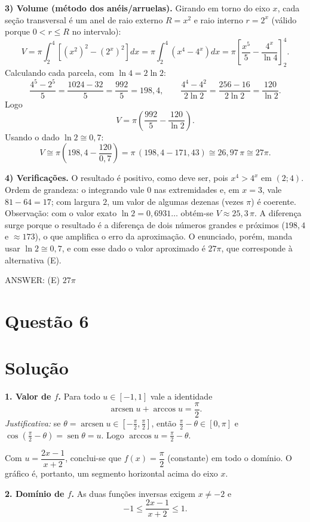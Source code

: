 \documentclass{article}%
\begin{document}
\textbf{3) Volume (método dos anéis/arruelas).} Girando em torno do eixo $x$, cada seção transversal é um anel de raio externo $R=x^2$ e raio interno $r=2^x$ (válido porque $0<r\le R$ no intervalo):
\[
V=\pi\int_{2}^{4}\left[(x^2)^2-(2^x)^2\right]dx=\pi\int_{2}^{4}\left(x^4-4^x\right)dx
=\pi\left[\frac{x^5}{5}-\frac{4^x}{\ln 4}\right]_{2}^{4}.
\]
Calculando cada parcela, com $\ln 4=2\ln 2$:
\[
\frac{4^5-2^5}{5}=\frac{1024-32}{5}=\frac{992}{5}=198{,}4,
\qquad
\frac{4^4-4^2}{2\ln 2}=\frac{256-16}{2\ln 2}=\frac{120}{\ln 2}.
\]
Logo
\[
V=\pi\left(\frac{992}{5}-\frac{120}{\ln 2}\right).
\]
Usando o dado $\ln 2\cong 0{,}7$:
\[
V\cong\pi\left(198{,}4-\frac{120}{0{,}7}\right)=\pi\,(198{,}4-171{,}43)\cong 26{,}97\,\pi\cong 27\pi .
\]

\textbf{4) Verificações.} O resultado é positivo, como deve ser, pois $x^4>4^x$ em $(2;4)$. Ordem de grandeza: o integrando vale $0$ nas extremidades e, em $x=3$, vale $81-64=17$; com largura $2$, um valor de algumas dezenas (vezes $\pi$) é coerente. Observação: com o valor exato $\ln 2=0{,}6931\ldots$ obtém-se $V\approx 25{,}3\,\pi$. A diferença surge porque o resultado é a diferença de dois números grandes e próximos ($198{,}4$ e $\approx 173$), o que amplifica o erro da aproximação. O enunciado, porém, manda usar $\ln 2\cong 0{,}7$, e com esse dado o valor aproximado é $27\pi$, que corresponde à alternativa (E).

ANSWER: (E) $27\pi$%
\newpage%
\section*{Questão 6}

\section*{Solução}

\textbf{1. Valor de $f$.} Para todo $u\in[-1,1]$ vale a identidade
\[
\operatorname{arcsen} u+\arccos u=\frac{\pi}{2}.
\]
\emph{Justificativa:} se $\theta=\operatorname{arcsen} u\in\left[-\frac{\pi}{2},\frac{\pi}{2}\right]$, então $\frac{\pi}{2}-\theta\in[0,\pi]$ e $\cos\left(\frac{\pi}{2}-\theta\right)=\operatorname{sen}\theta=u$. Logo $\arccos u=\frac{\pi}{2}-\theta$.

Com $u=\dfrac{2x-1}{x+2}$, conclui-se que $f(x)=\dfrac{\pi}{2}$ (constante) em todo o domínio. O gráfico é, portanto, um segmento horizontal acima do eixo $x$.

\textbf{2. Domínio de $f$.} As duas funções inversas exigem $x\neq -2$ e
\[
-1\le \frac{2x-1}{x+2}\le 1 .
\]
\end{document}
